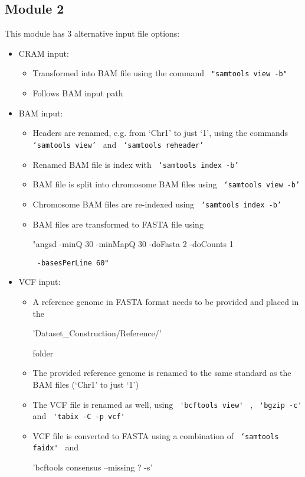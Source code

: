 \documentclass{book}
\begin{document}
\subsection{\huge Module 2}

\vspace{1.2cm}

{\large This module has 3 alternative input file options:}
\vspace{0.5cm}

\begin{itemize}

\item {\large CRAM input:}

\begin{itemize}	
\item Transformed into BAM file using the command \verb| "samtools view -b" |
\item Follows BAM input path
\end{itemize}

\item {\large BAM input:}
\begin{itemize}	

\item Headers are renamed, e.g. from ‘Chr1’ to just ‘1’, using the commands \verb| ‘samtools view’ | and \verb| ‘samtools reheader’ |
\item Renamed BAM file is index with \verb| ‘samtools index -b’ |
\item BAM file is split into chromosome BAM files using \verb| ‘samtools view -b’ |
\item Chromosome BAM files are re-indexed using \verb| ‘samtools index -b’ |
\item BAM files are transformed to FASTA file using \begin{spverbatim} "angsd -minQ 30 -minMapQ 30 -doFasta 2 -doCounts 1 \end{spverbatim}
\verb| -basesPerLine 60" |
\end{itemize}

\item {\large VCF input:}
\begin{itemize}	
\item A reference genome in FASTA format needs to be provided and placed in the \begin{spverbatim} 'Dataset_Construction/Reference/' \end{spverbatim} folder
\item The provided reference genome is renamed to the same standard as the BAM files (‘Chr1’ to just ‘1’)
\item The VCF file is renamed as well, using \verb| 'bcftools view' | , \verb| 'bgzip -c' | and \verb| 'tabix -C -p vcf' |
\item VCF file is converted to FASTA using a combination of \verb| ‘samtools faidx' | and
\begin{spverbatim}
'bcftools consensus --missing ? -s'
\end{spverbatim}


\end{itemize}
\end{itemize}
\end{document}
